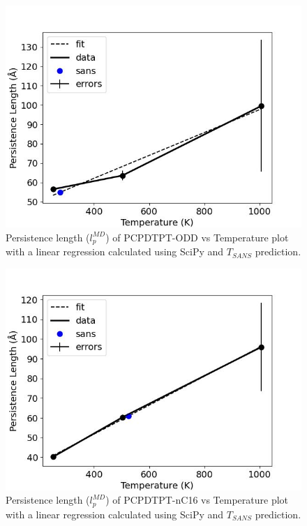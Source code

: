 \begin{figure}
    \centering
    \includegraphics[width=1\linewidth]{src/figures/pers_l_figs/untitled folder/pcpdtpt/ODD_plot.jpeg}
    \caption{Persistence length ($l_p^{MD}$) of PCPDTPT-ODD vs Temperature plot with a linear regression calculated using SciPy \citep{2020SciPy-NMeth} and $T_{SANS}$ prediction.}
    \label{fig:ODD_plot}
\end{figure}

\begin{figure}
    \centering
    \includegraphics[width=1\linewidth]{src/figures/pers_l_figs/untitled folder/pcpdtpt/nC16_plot.jpeg}
    \caption{Persistence length ($l_p^{MD}$) of PCPDTPT-nC16 vs Temperature plot with a linear regression calculated using SciPy \citep{2020SciPy-NMeth} and $T_{SANS}$ prediction.}
    \label{fig:nC16_plot}
\end{figure}


